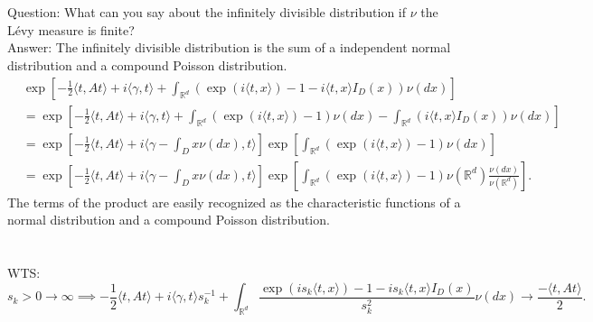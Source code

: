 \documentclass[a4paper,11pt]{article}
\begin{document}
\section{}
Question: What can you say about the infinitely divisible distribution if $\nu$ the Lévy measure is finite? \\
Answer: The infinitely divisible distribution is the sum of a independent normal distribution and a compound Poisson distribution.
\begin{align}
     & \exp \left[-\frac{1} {2} \langle t, A t \rangle+i \langle\gamma, t \rangle+\int_{\mathbb{R}^{d}} \left( \exp ( i \langle t, x \rangle)-1-i \langle t, x \rangle I_{D} ( x ) \right) \nu( d x ) \right] \\
     & =\exp \left[-\frac{1} {2} \langle t, A t \rangle+i \langle\gamma, t \rangle+\int_{\mathbb{R}^{d}} \left( \exp ( i \langle t, x \rangle)-1 \right)\nu( d x )
        -\int_{\mathbb{R}^{d}}
    \left(i \langle t, x \rangle I_{D} ( x ) \right) \nu( d x ) \right]                                                                                                                                       \\
     & =\exp \left[-\frac{1} {2} \langle t, A t \rangle+i \langle\gamma -\int_{D}x \nu(dx) , t \rangle \right]
    \exp \left[ \int_{\mathbb{R}^{d}} \left( \exp ( i \langle t, x \rangle)-1 \right)\nu( d x ) \right]                                                                                                       \\
     & =\exp \left[-\frac{1} {2} \langle t, A t \rangle+i \langle\gamma -\int_{D}x \nu(dx) , t \rangle \right]
    \exp \left[ \int_{\mathbb{R}^{d}} \left( \exp ( i \langle t, x \rangle)-1 \right)\nu( \mathbb{R}^{d}) \frac{\nu( d x  )}{\nu(\mathbb{R}^{d})} \right]
    .
\end{align}
The terms of the product are easily recognized as the characteristic
functions of a normal distribution and a compound Poisson distribution.

\section{}
WTS:
\begin{equation}
    s_{k}>0\rightarrow \infty \implies
    - \frac{1} {2} \langle t, A t \rangle+i \langle\gamma, t \rangle s_k^{-1}+\int_{\mathbb{R}^{d}} \frac{\exp ( i s_k \langle t, x \rangle)-1-i s_k \langle t, x \rangle I_{D} ( x )} {s_k^{2}} \nu( d x )
    \rightarrow  \frac{- \langle t, A t \rangle}{2}
    .
\end{equation}
\end{document}

